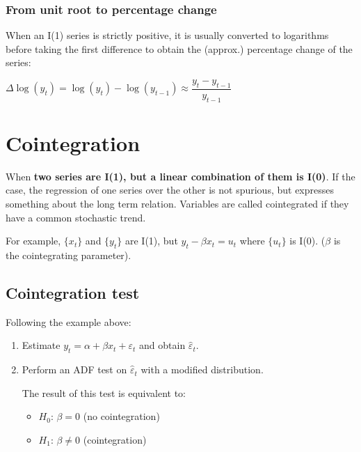 \documentclass[10pt, a4paper, landscape]{article}
\begin{document}
\begin{multicols}{3}
		\columnbreak
		
		\subsubsection*{From unit root to percentage change}
		
		When an I(1) series is strictly positive, it is usually converted to logarithms before taking the first difference to obtain the (approx.) percentage change of the series:
		
		\begin{center}
			$\Delta \log(y_{t}) = \log(y_{t}) - \log(y_{t - 1}) \approx \dfrac{y_t - y_{t - 1}} {y_{t - 1}}$
		\end{center}
		
		\section*{Cointegration}
		
		When \textbf{two series are I(1), but a linear combination of them is I(0)}. If the case, the regression of one series over the other is not spurious, but expresses something about the long term relation. Variables are called cointegrated if they have a common stochastic trend.
		
		For example, $\lbrace x_{t} \rbrace$ and $\lbrace y_{t} \rbrace$ are I(1), but $y_{t} - \beta x_{t} = u_{t}$ where $\lbrace u_{t} \rbrace$ is I(0). ($\beta$ is the cointegrating parameter).

		\subsection*{Cointegration test}
		
		Following the example above:
		
		\begin{enumerate}[leftmargin=*]
			\item Estimate $y_{t} = \alpha + \beta x_{t} + \varepsilon_{t}$ and obtain $\hat{\varepsilon}_{t}$.
			\item Perform an ADF test on $\hat{\varepsilon}_{t}$ with a modified distribution.
			
			The result of this test is equivalent to:
			
			\begin{itemize}[leftmargin=*]
				\item $H_{0}$: $\beta = 0$ (no cointegration)
				\item $H_{1}$: $\beta \neq 0$ (cointegration)
			\end{itemize}
			

\end{enumerate}
\end{multicols}
\end{document}
